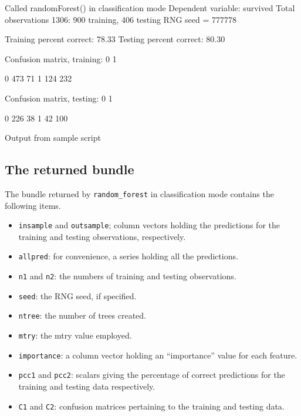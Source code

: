 \documentclass{article}
\begin{document}
\begin{script}[htbp]
  \begin{scodebit}
Called randomForest() in classification mode
Dependent variable: survived
Total observations 1306: 900 training, 406 testing
RNG seed = 777778

Training percent correct: 78.33
Testing percent correct:  80.30

Confusion matrix, training:
             0            1

0          473           71
1          124          232

Confusion matrix, testing:
             0            1

0          226           38
1           42          100
\end{scodebit}
  \caption{Output from sample script}
  \label{output}
\end{script}

\subsection{The returned bundle}

The bundle returned by \texttt{random\_forest} in classification mode
contains the following items.
\begin{itemize}
\item \texttt{insample} and \texttt{outsample}; column vectors holding
  the predictions for the training and testing observations,
  respectively.
\item \texttt{allpred}: for convenience, a series holding all the
  predictions.
\item \texttt{n1} and \texttt{n2}: the numbers of training and testing
  observations.
\item \texttt{seed}: the RNG seed, if specified.
\item \texttt{ntree}: the number of trees created.
\item \texttt{mtry}: the mtry value employed.
\item \texttt{importance}: a column vector holding an ``importance''
  value for each feature.
\item \texttt{pcc1} and \texttt{pcc2}: scalars giving the percentage
  of correct predictions for the training and testing data
  respectively.
\item \texttt{C1} and \texttt{C2}: confusion matrices pertaining to
  the training and testing data.
\end{itemize}
\end{document}
